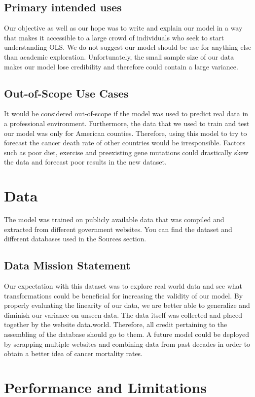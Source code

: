 \documentclass{article}
\begin{document}
\subsection*{Primary intended uses}
Our objective as well as our hope was to write and explain our model in a way that makes it accessible to a large crowd of individuals who seek to start understanding OLS. 
We do not suggest our model should be use for anything else than academic exploration. Unfortunately, the small sample size of our data makes our model lose credibility and therefore could contain a large variance.  
\subsection*{Out-of-Scope Use Cases}
It would be considered out-of-scope if the model was used to predict real data in a professional environment. Furthermore, the data that we used to train and test our model was only for American counties. Therefore, using this model to try to forecast the cancer death rate of other countries would be irresponsible. Factors such as poor diet, exercise and preexisting gene mutations could drastically skew the data and forecast poor results in the new dataset.  
\section*{Data}
The model was trained on publicly available data that was compiled and extracted from different government websites. You can find the dataset and different databases used in the Sources section.
\subsection*{Data Mission Statement}
Our expectation with this dataset was to explore real world data and see what transformations could be beneficial for increasing the validity of our model. By properly evaluating the linearity of our data, we are better able to generalize and diminish our variance on unseen data. The data itself was collected and placed together by the website data.world. Therefore, all credit pertaining to the assembling of the database should go to them. A future model could be deployed by scrapping multiple websites and combining data from past decades in order to obtain a better idea of cancer mortality rates.  
\section*{Performance and Limitations}
\end{document}
